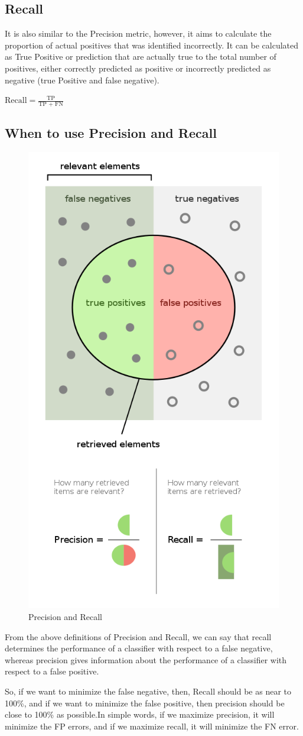    
    
    \subsection{Recall}
    It is also similar to the Precision metric, however, it aims to calculate the proportion of actual positives that was identified incorrectly. It can be calculated as True Positive or prediction that are actually true to the total number of positives, either correctly predicted as positive or incorrectly predicted as negative (true Positive and false negative)\cite{precision-recall}.
    \begin{center}
        \(\displaystyle{\text{Recall} = \frac{\text{TP}}{\text{TP + FN}}}\) 
    \end{center}

    \subsection{When to use Precision and Recall}

    \begin{figure}
        \centering
        \includegraphics[width=0.5\linewidth]{graphics//chapter3/Precisionrecall.svg.png}
        \caption{Precision and Recall}
        \label{fig:precision-recall}
    \end{figure}
    From the above definitions of Precision and Recall, we can say that recall determines the performance of a classifier with respect to a false negative, whereas precision gives information about the performance of a classifier with respect to a false positive.\par\vspace{1em}
    So, if we want to minimize the false negative, then, Recall should be as near to 100\%, and if we want to minimize the false positive, then precision should be close to 100\% as possible.In simple words, if we maximize precision, it will minimize the FP errors, and if we maximize recall, it will minimize the FN error.
    
